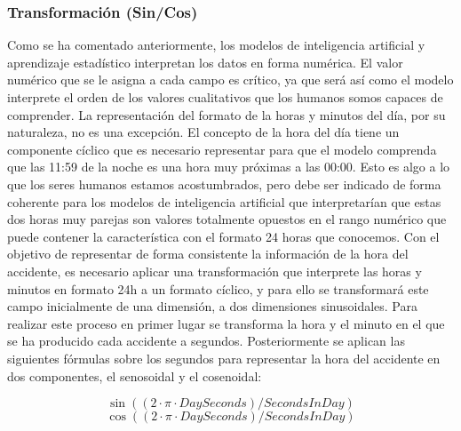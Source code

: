 
\subsubsection{Transformación (Sin/Cos)}


Como se ha comentado anteriormente, los modelos de inteligencia artificial y aprendizaje estadístico interpretan los datos en forma numérica. El valor numérico que se le asigna a cada campo es crítico, ya que será así como el modelo interprete el orden de los valores cualitativos que los humanos somos capaces de comprender. La representación del formato de la horas y minutos del día, por su naturaleza, no es una excepción. El concepto de la hora del día tiene un componente cíclico que es necesario representar para que el modelo comprenda que las 11:59 de la noche es una hora muy próximas a las 00:00. Esto es algo a lo que los seres humanos estamos acostumbrados, pero debe ser indicado de forma coherente para los modelos de inteligencia artificial que interpretarían que estas dos horas muy parejas son valores totalmente opuestos en el rango numérico que puede contener la característica con el formato 24 horas que conocemos. Con el objetivo de representar de forma consistente la información de la hora del accidente, es necesario aplicar una transformación que interprete las horas y minutos en formato 24h a un formato cíclico, y para ello se transformará este campo inicialmente de una dimensión, a dos dimensiones sinusoidales. Para realizar este proceso en primer lugar se transforma la hora y el minuto en el que se ha producido cada accidente a segundos. Posteriormente se aplican las siguientes fórmulas sobre los segundos para representar la hora del accidente en dos componentes, el senosoidal y el cosenoidal:


\begin{equation}
	\sin((2 \cdot \pi \cdot DaySeconds)/SecondsInDay)
\end{equation}
\begin{equation}
	\cos((2 \cdot \pi \cdot DaySeconds)/SecondsInDay)
\end{equation}


